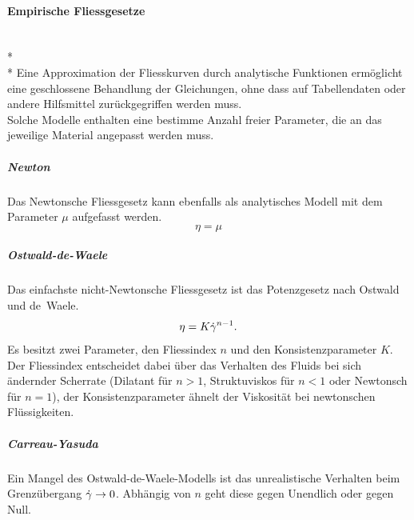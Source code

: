%
\paragraph{Empirische Fliessgesetze}~\\*~\\*
Eine Approximation der Fliesskurven durch analytische Funktionen ermöglicht eine geschlossene Behandlung der Gleichungen, ohne dass auf Tabellendaten oder andere Hilfsmittel zurückgegriffen werden muss.\\
Solche Modelle enthalten eine bestimme Anzahl freier Parameter, die an das jeweilige Material angepasst werden muss.
\subparagraph{Newton}
Das Newtonsche Fliessgesetz kann ebenfalls als analytisches Modell mit dem Parameter $\mu$ aufgefasst werden.
\begin{equation}
    \eta = \mu
    \label{eq:fg:newton}
\end{equation}
\subparagraph{Ostwald-de-Waele}
Das einfachste nicht-Newtonsche Fliessgesetz ist das Potenzgesetz nach Ostwald und de~Waele.
\begin{equation}
    \eta=K\dot\gamma^{n-1}.
    \label{eq:fg:potenz}
\end{equation}
 Es besitzt zwei Parameter, den Fliessindex $n$ und den Konsistenzparameter $K$. Der Fliessindex entscheidet dabei über das Verhalten des Fluids bei sich ändernder Scherrate (Dilatant für $n>1$, Struktuviskos für $n<1$ oder Newtonsch für $n=1$), der Konsistenzparameter ähnelt der Viskosität bei newtonschen Flüssigkeiten.
%
\subparagraph{Carreau-Yasuda}
Ein Mangel des Ostwald-de-Waele-Modells ist das unrealistische Verhalten beim Grenzübergang $\dot\gamma\rightarrow 0$. Abhängig von $n$ geht diese gegen Unendlich oder gegen Null.
